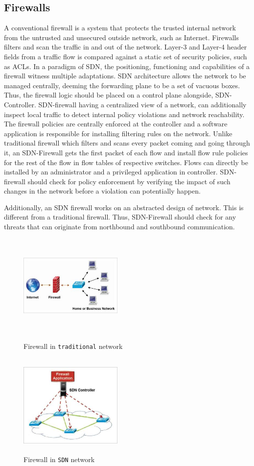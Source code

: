 \subsection{Firewalls}

A conventional firewall is a system that protects the trusted internal network from the untrusted and unsecured outside network, such as Internet.
Firewalls filters and scan the traffic in and out of the network. Layer-3 and Layer-4 header fields from a traffic flow is compared against a static set of security policies, such as ACLs. In a paradigm of SDN, the positioning, functioning and capabilities of a firewall witness multiple adaptations. SDN architecture allows the network to be managed centrally, deeming the forwarding plane to be a set of vacuous boxes. Thus, the firewall logic should be placed on a control plane alongside, SDN-Controller. SDN-firewall having a centralized view of a network, can additionally inspect local traffic to detect internal policy violations and network reachability. The firewall policies are centrally enforced at the controller and a software application is responsible for installing filtering rules on the network. 
Unlike traditional firewall which filters and scans every packet coming and going through it, an SDN-Firewall gets the first packet of each flow and install flow rule policies for the rest of the flow in flow tables of respective switches. Flows can directly be installed by an administrator and a privileged application in controller. SDN-firewall should check for policy enforcement by verifying the impact of such changes in the network before a violation can potentially happen. 

Additionally, an SDN firewall works on an abstracted design of network. This is different from a traditional firewall. Thus, SDN-Firewall should check for any threats that can originate from northbound and southbound communication.
 
\begin{figure}
	\includegraphics[height=2in, width=2in]{traditional}
	\caption{ Firewall in  \texttt{traditional} network}
	\includegraphics[height=2in, width=2in]{SDN-Firewall}
	\caption{ Firewall in  \texttt{SDN} network}
\end{figure}   

